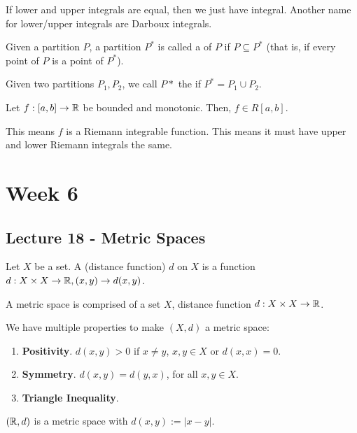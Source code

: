 \documentclass{book}
\begin{document}
If lower and upper integrals are equal, then we just have integral. Another name for lower/upper integrals are Darboux integrals.

\begin{defn}
    Given a partition $P$, a partition $P^*$ is called a  of $P$ if $P \subseteq P^*$ (that is, if every point of $P$ is a point of $P^*$). 
\end{defn}

Given two partitions $P_1, P_2$, we call $P*$ the  if $P^* = P_1 \cup P_2$.

\begin{thm}
    Let $f: [a, b] \to \mathbb{R}$ be bounded and monotonic. Then, $f \in R[a, b]$.

    This means $f$ is a Riemann integrable function. This means it must have upper and lower Riemann integrals the same.
\end{thm}

\chapter{Week 6}
\section{Lecture 18 - Metric Spaces}
\begin{defn} Let $X$ be a set. A  (distance function) $d$ on $X$ is a function $d : X \times X \to \mathbb{R}, (x, y) \to d(x, y)$.
\end{defn}

\begin{defn}
    A metric space is comprised of a set $X$, distance function $d : X \times X \to \mathbb{R}$.

    We have multiple properties to make $(X, d)$ a metric space:
    \begin{enumerate}
        \item \textbf{Positivity}. $d(x, y) > 0$ if $x \neq y$, $x, y \in X$ or $d(x, x) = 0$.
        \item \textbf{Symmetry}. $d(x, y) = d(y, x)$, for all $x, y \in X$.
        \item \textbf{Triangle Inequality}.
    \end{enumerate}
\end{defn}

\begin{ex}
    $(\mathbb{R}, d)$ is a metric space with $d(x, y) := |x - y|$. 
\end{ex}
\end{document}
